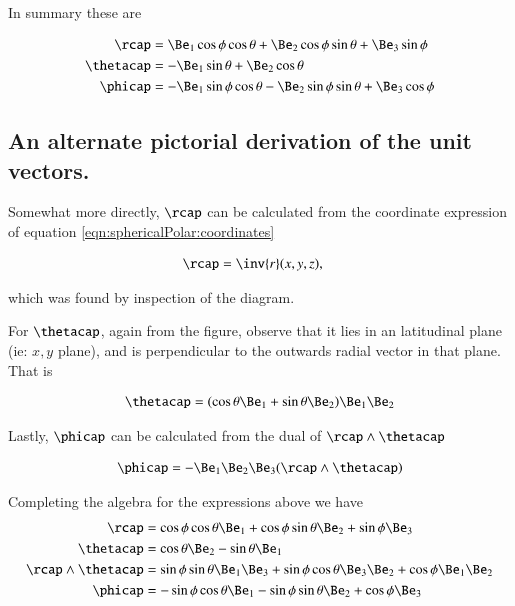 In summary these are

\begin{align}\label{eqn:sphericalPolar:unitTxSummary}
\rcap &= \Be_1 \cos\phi \cos\theta + \Be_2 \cos\phi \sin\theta + \Be_3 \sin\phi \\
\thetacap &= - \Be_1 \sin\theta + \Be_2 \cos\theta \\
\phicap &= - \Be_1 \sin\phi \cos\theta - \Be_2 \sin\phi \sin\theta + \Be_3 \cos\phi
\end{align}

\subsection{An alternate pictorial derivation of the unit vectors. }

Somewhat more directly, $\rcap$ can be calculated from the coordinate expression of equation \ref{eqn:sphericalPolar:coordinates}

\begin{align*}
\rcap 
&= \inv{r} (x, y, z),
\end{align*}

which was found by inspection of the diagram.

For $\thetacap$, again from the figure, observe that it lies in an
latitudinal plane (ie: $x,y$ plane), and is perpendicular to the outwards radial vector in that plane.  That is

\begin{align*}
\thetacap 
&= (\cos\theta \Be_1 + \sin\theta \Be_2) \Be_1 \Be_2 \\
\end{align*}

Lastly, $\phicap$ can be calculated from the dual of $\rcap \wedge \thetacap$

\begin{align*}
\phicap 
&= - \Be_1 \Be_2 \Be_3 (\rcap \wedge \thetacap) \\
\end{align*}

Completing the algebra for the expressions above we have
\begin{align}
\rcap 
&=
\cos\phi \cos\theta \Be_1
+ \cos\phi \sin\theta \Be_2
+ \sin\phi \Be_3 \\
\thetacap 
&= \cos\theta \Be_2 - \sin\theta \Be_1 \\
\rcap \wedge \thetacap 
&=
\sin\phi \sin\theta \Be_1 \Be_3 
+ \sin\phi \cos\theta \Be_3 \Be_2 
+ \cos\phi \Be_1 \Be_2 \\
\phicap 
&=
- \sin\phi \cos\theta \Be_1 
- \sin\phi \sin\theta \Be_2 
+ \cos\phi \Be_3 %
\end{align}

